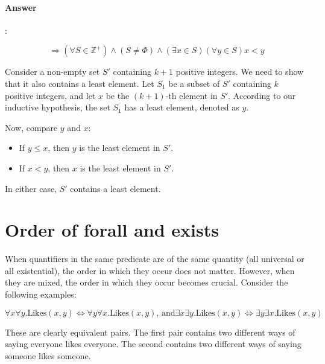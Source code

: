 \documentclass{article}
\begin{document}
\paragraph{Answer}:

\begin{equation*}
  [S\prime=\{ a_1,a_2,a_3,...a_{k+1}\}S\prime \subset \mathbb{Z}^+][(x \in S\prime)(\forall y \in S\prime))][(x < y) \lor (y \leq x)] \Rightarrow (\forall S \in \mathbb{Z}^+) \land (S \neq \Phi) \land (\exists x \in S)(\forall y \in S)x < y
\end{equation*}


Consider a non-empty set $S'$ containing $k+1$ positive integers. We need to show that it also contains a least element. Let $S_1$ be a subset of $S'$ containing $k$ positive integers, and let $x$ be the $(k+1)$-th element in $S'$. According to our inductive hypothesis, the set $S_1$ has a least element, denoted as $y$.

Now, compare $y$ and $x$:

\begin{itemize}
  \item If $y \leq x$, then $y$ is the least element in $S'$.
  \item If $x < y$, then $x$ is the least element in $S'$. 
\end{itemize}


In either case, $S'$ contains a least element.



\section{Order of forall and exists}

When quantifiers in the same predicate are of the same quantity (all universal or all existential), the order in which they occur does not matter. However, when they are mixed, the order in which they occur becomes crucial. Consider the following examples:

\begin{equation*}
  \forall x \forall y \text{.Likes}(x, y) \Leftrightarrow \forall y \forall x \text{.Likes}(x, y) \text{, and}
  \exists x \exists y \text{.Likes}(x, y) \Leftrightarrow \exists y \exists x \text{.Likes}(x, y)
\end{equation*}

These are clearly equivalent pairs. The first pair contains two different ways of saying everyone likes everyone. The second contains two different ways of saying someone likes someone.
\end{document}
